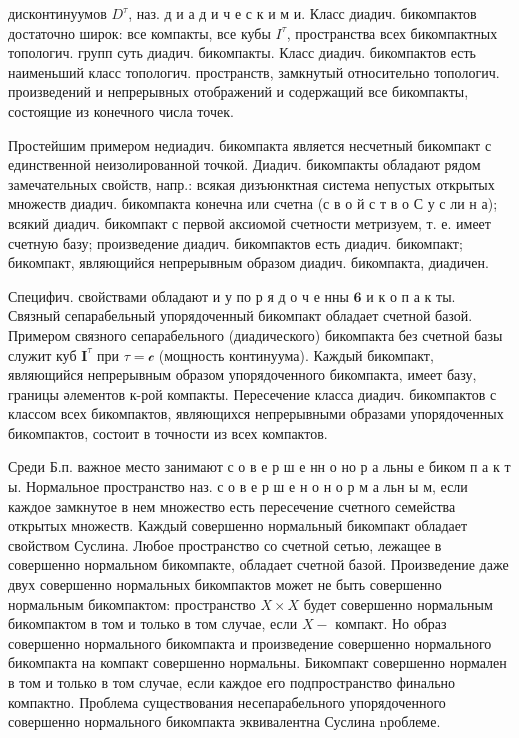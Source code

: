 \documentclass[10pt]{article}
\begin{document}
дисконтинуумов $D^{\tau}$, наз. д и а д и ч е с к и м и. Класс диадич. бикомпактов достаточно широк: все компакты, все кубы $I^{\tau}$, пространства всех бикомпактных топологич. групп суть диадич. бикомпакты. Класс диадич. бикомпактов есть наименьший класс топологич. пространств, замкнутый относительно топологич. произведений и непрерывных отображений и содержащий все бикомпакты, состоящие из конечного числа точек.



Простейшим примером недиадич. бикомпакта является несчетный бикомпакт с единственной неизолированной точкой. Диадич. бикомпакты обладают рядом замечательных свойств, напр.: всякая дизъюнктная система непустых открытых множеств диадич. бикомпакта конечна или счетна (с в о й с т в о С у с ли н а); всякий диадич. бикомпакт с первой аксиомой счетности метризуем, т. е. имеет счетную базу; произведение диадич. бикомпактов есть диадич. бикомпакт; бикомпакт, являющийся непрерывным образом диадич. бикомпакта, диадичен.



Специфич. свойствами обладают и у по р я д о ч е нны $\mathbf{6}$ и к о п а к ты. Связный сепарабельный упорядоченный бикомпакт обладает счетной базой. Примером связного сепарабельного (диадического) бикомпакта без счетной базы служит куб $\boldsymbol{I}^{\tau}$ при $\tau=\mathcal{c}$ (мощность континуума). Каждый бикомпакт, являющийся непрерывным образом упорядоченного бикомпакта, имеет базу, границы әлементов к-рой компакты. Пересечение класса диадич. бикомпактов с классом всех бикомпактов, являющихся непрерывными образами упорядоченных бикомпактов, состоит в точности из всех компактов.



Среди Б.п. важное место занимают с о в е р ш е нн о но р а льны е биком п а к т ы. Нормальное пространство наз. с о в е р ш е н о н о р м а льн ы м, если каждое замкнутое в нем множество есть пересечение счетного семейства открытых множеств. Каждый совершенно нормальный бикомпакт обладает свойством Суслина. Любое пространство со счетной сетью, лежащее в совершенно нормальном бикомпакте, обладает счетной базой. Произведение даже двух совершенно нормальных бикомпактов может не быть совершенно нормальным бикомпактом: пространство $X \times X$ будет совершенно нормальным бикомпактом в том и только в том случае, если $X-$ компакт. Но образ совершенно нормального бикомпакта и произведение совершенно нормального бикомпакта на компакт совершенно нормальны. Бикомпакт совершенно нормален в том и только в том случае, если каждое его подпространство финально компактно. Проблема существования несепарабельного упорядоченного совершенно нормального бикомпакта эквивалентна Суслина nроблеме.
\end{document}
